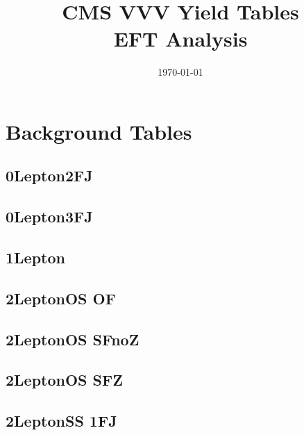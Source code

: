\documentclass[landscape, 12pt,letterpaper]{article}
\title{CMS VVV Yield Tables\\EFT Analysis}
\author{}
\date{\today}
\begin{document}
\maketitle
\thispagestyle{empty}

\newpage

\section{Background Tables}
\subsection{0Lepton2FJ }


\newpage

\subsection{0Lepton3FJ }


\newpage

\subsection{1Lepton }


\newpage

\subsection{2LeptonOS OF}


\newpage

\subsection{2LeptonOS SFnoZ}


\newpage

\subsection{2LeptonOS SFZ}


\newpage

\subsection{2LeptonSS 1FJ}


\newpage
\end{document}
